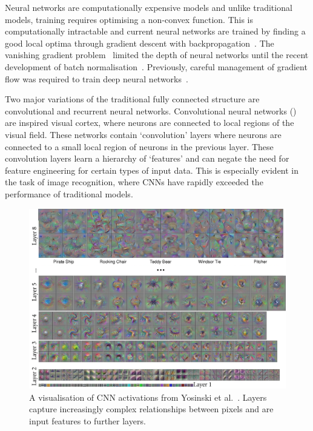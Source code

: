 \documentclass[12pt, twoside]{book}
\renewcommand\emph[1]{\textit{\color{USred}{#1}}}
\begin{document}
Neural networks are computationally expensive models and unlike traditional models, training requires optimising a non-convex function. This is computationally intractable and current neural networks are trained by finding a good local optima through gradient descent with backpropagation~\cite{convexopt}. The vanishing gradient problem~\cite{vanishinggradient} limited the depth of neural networks until the recent development of batch normalisation~\cite{batchnorm}. Previously, careful management of gradient flow was required to train deep neural networks~\cite{googlenet}. 

Two major variations of the traditional fully connected structure are convolutional and recurrent neural networks. Convolutional neural networks (\emph{CNNs}) are inspired visual cortex, where neurons are connected to local regions of the visual field. These networks contain `convolution' layers where neurons are connected to a small local region of neurons in the previous layer. These convolution layers learn a hierarchy of `features' and can negate the need for feature engineering for certain types of input data. This is especially evident in the task of image recognition, where CNNs have rapidly exceeded the performance of traditional models.


\begin{figure}[h]
	\label{cnnvis}
	\centering\includegraphics[width=1\linewidth]{cnnvis.png}
	\caption{A visualisation of CNN activations from Yosinski et al.~\cite{cnnvis}. Layers capture increasingly complex relationships between pixels and are input features to further layers. }
\end{figure}
\end{document}
